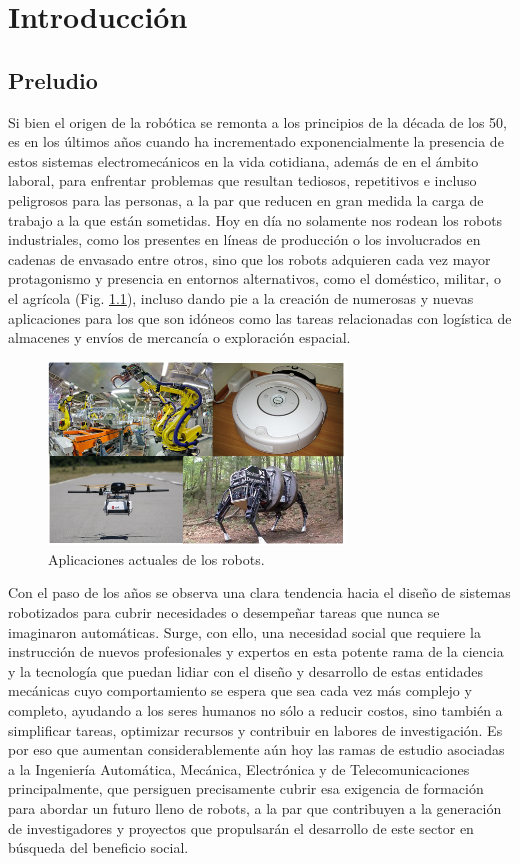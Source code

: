 \chapter{Introducción}

\section{Preludio}

Si bien el origen de la robótica se remonta a los principios de la década de los 50, es en los últimos años cuando ha incrementado exponencialmente la presencia de estos sistemas electromecánicos en la vida cotidiana, además de en el ámbito laboral, para enfrentar problemas que resultan tediosos, repetitivos e incluso peligrosos para las personas, a la par que reducen en gran medida la carga de trabajo a la que están sometidas. Hoy en día no solamente nos rodean los robots industriales, como los presentes en líneas de producción o los involucrados en cadenas de envasado entre otros, sino que los robots adquieren cada vez mayor protagonismo y presencia en entornos alternativos, como el doméstico, militar, o el agrícola (Fig. \ref{robots}), incluso dando pie a la creación de numerosas y nuevas aplicaciones para los que son idóneos como las tareas relacionadas con logística de almacenes y envíos de mercancía o exploración espacial.

\begin{figure}[!hbtp]  \centering\noindent
    \includegraphics[width=0.7\textwidth]{figures/robots.png}
    \caption{Aplicaciones actuales de los robots.}
    \label{robots}
\end{figure}

Con el paso de los años se observa una clara tendencia hacia el diseño de sistemas robotizados para cubrir necesidades o desempeñar tareas que nunca se imaginaron automáticas. Surge, con ello, una necesidad social que requiere la instrucción de nuevos profesionales y expertos en esta potente rama de la ciencia y la tecnología que puedan lidiar con el diseño y desarrollo de estas entidades mecánicas cuyo comportamiento se espera que sea cada vez más complejo y completo, ayudando a los seres humanos no sólo a reducir costos, sino también a simplificar tareas, optimizar recursos y contribuir en labores de investigación. Es por eso que aumentan considerablemente aún hoy las ramas de estudio asociadas a la Ingeniería Automática, Mecánica, Electrónica y de Telecomunicaciones principalmente, que persiguen precisamente cubrir esa exigencia de formación para abordar un futuro lleno de robots, a la par que contribuyen a la generación de investigadores y proyectos que propulsarán el desarrollo de este sector en búsqueda del beneficio social. 

